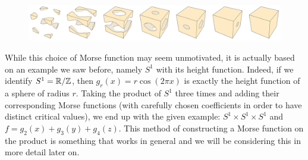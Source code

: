\begin{eg}[$T^{3} = S^{1} \times S^{1} \times S^{1}$]
    \begin{figure}[H]
    \centering
    \includegraphics[width=0.90\paperwidth]{./notebooks/three-torus/output.png}
    \label{fig:three-torus-handle-decomposition}
\end{figure}
While this choice of Morse function may seem unmotivated, it is actually based on an example we saw before, namely $S^{1}$ with its height function.
Indeed, if we identify $S^{1} = \mathbb{R} / \mathbb{Z}$, then $g_r(x) = r\cos(2 \pi x)$ is exactly the height function of a sphere of radius $r$.
Taking the product of $S^{1}$ three times and adding their corresponding Morse functions (with carefully chosen coefficients in order to have distinct critical values), we end up with the given example: $S^{1}\times S^{1} \times S^{1}$ and $f = g_2(x) + g_3(y) + g_4(z)$.
This method of constructing a Morse function on the product is something that works in general and we will be considering this in more detail later on.

\end{eg}

